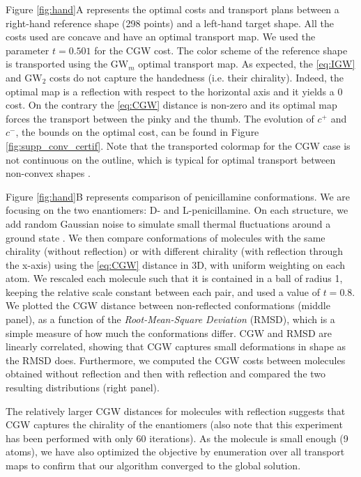 \documentclass{article}
\newcommand{\1}{\mathbf{1}}
\newcommand{\CGW}{\mathrm{CGW}}
\newcommand{\GW}{\mathrm{GW}}
\theoremstyle{definition}
\theoremstyle{remark}
\begin{document}
Figure \ref{fig:hand}A represents the optimal costs and transport plans between a right-hand reference shape (298 points) and a left-hand target shape. All the costs used are concave and have an optimal transport map. We used the parameter $t=0.501 $ for the $\CGW$ cost. The color scheme of the reference shape is transported using the $\GW_m$ optimal transport map. As expected, the \ref{eq:IGW} and  $\GW_2$ costs  do not capture the handedness (i.e. their chirality). Indeed, the optimal map is a reflection with respect to the horizontal axis and it yields a $0$ cost. On the contrary the \ref{eq:CGW} distance is non-zero and its optimal map forces the transport between the pinky and the thumb. The evolution of $c^+$ and $c^-$, the bounds on the optimal cost, can be found in Figure \ref{fig:supp_conv_certif}. Note that the transported colormap for the $\CGW$ case is not continuous on the outline, which is typical for optimal transport between non-convex shapes \cite{nouri2025optimal}.

Figure \ref{fig:hand}B represents comparison of penicillamine conformations. We are focusing on the two enantiomers: D- and L-penicillamine. On each structure, we add random Gaussian noise to simulate small thermal fluctuations around a ground state \cite{frenkel2023understanding}. We then compare conformations of molecules with the same chirality (without reflection) or with different chirality (with reflection through the x-axis) using the \ref{eq:CGW} distance in 3D, with uniform weighting on each atom. We rescaled each molecule such that it is contained in a ball of radius 1, keeping the relative scale constant between each pair, and used a value of $t=0.8$. We plotted the  $\CGW$ distance between non-reflected conformations (middle panel), as a function of the \emph{Root-Mean-Square Deviation} (RMSD), which is a simple measure of how much the conformations differ. $\CGW$ and RMSD are linearly correlated, showing that $\CGW$ captures small deformations in shape as the RMSD does.
Furthermore, we computed the $\CGW$ costs between molecules obtained without reflection and then with reflection and compared the two resulting distributions (right panel). 

The relatively larger CGW distances for molecules with reflection suggests that CGW captures the chirality of the enantiomers (also note that this experiment has been performed with only 60 iterations). As the molecule is small enough (9 atoms), we have also optimized the objective by enumeration over all transport maps to confirm that our algorithm converged to the global solution.
\end{document}
